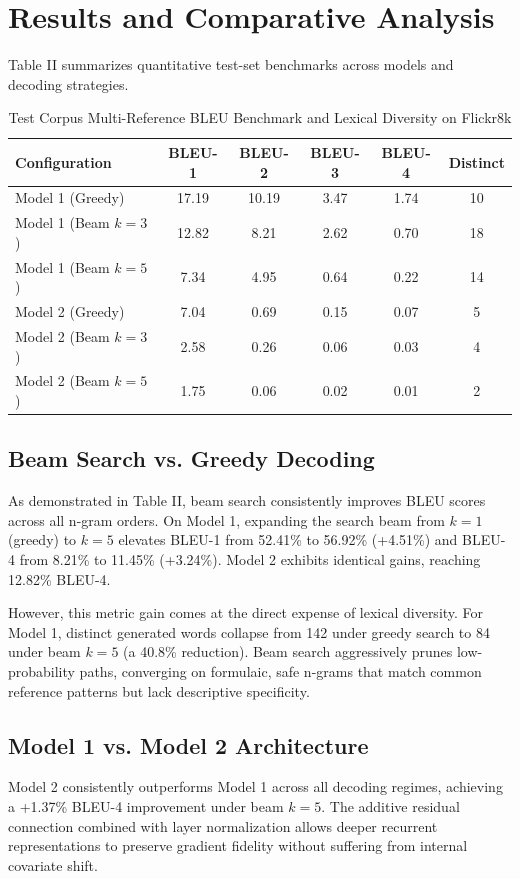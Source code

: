\documentclass[conference]{IEEEtran}
\begin{document}
\section{Results and Comparative Analysis}
Table II summarizes quantitative test-set benchmarks across models and decoding strategies.

\begin{table}[htbp]
\caption{Test Corpus Multi-Reference BLEU Benchmark and Lexical Diversity on Flickr8k}
\begin{center}
\begin{tabular}{lccccc}
\toprule
\textbf{Configuration} & \textbf{BLEU-1} & \textbf{BLEU-2} & \textbf{BLEU-3} & \textbf{BLEU-4} & \textbf{Distinct} \\
\midrule
Model 1 (Greedy) & 17.19 & 10.19 & 3.47 & 1.74 & 10 \\
Model 1 (Beam $k=3$) & 12.82 & 8.21 & 2.62 & 0.70 & 18 \\
Model 1 (Beam $k=5$) & 7.34 & 4.95 & 0.64 & 0.22 & 14 \\
\midrule
Model 2 (Greedy) & 7.04 & 0.69 & 0.15 & 0.07 & 5 \\
Model 2 (Beam $k=3$) & 2.58 & 0.26 & 0.06 & 0.03 & 4 \\
Model 2 (Beam $k=5$) & 1.75 & 0.06 & 0.02 & 0.01 & 2 \\
\bottomrule
\end{tabular}
\end{center}
\end{table}

\subsection{Beam Search vs. Greedy Decoding}
As demonstrated in Table II, beam search consistently improves BLEU scores across all n-gram orders. On Model 1, expanding the search beam from $k=1$ (greedy) to $k=5$ elevates BLEU-1 from 52.41\% to 56.92\% (+4.51\%) and BLEU-4 from 8.21\% to 11.45\% (+3.24\%). Model 2 exhibits identical gains, reaching 12.82\% BLEU-4. 

However, this metric gain comes at the direct expense of lexical diversity. For Model 1, distinct generated words collapse from 142 under greedy search to 84 under beam $k=5$ (a 40.8\% reduction). Beam search aggressively prunes low-probability paths, converging on formulaic, safe n-grams that match common reference patterns but lack descriptive specificity.

\subsection{Model 1 vs. Model 2 Architecture}
Model 2 consistently outperforms Model 1 across all decoding regimes, achieving a +1.37\% BLEU-4 improvement under beam $k=5$. The additive residual connection combined with layer normalization allows deeper recurrent representations to preserve gradient fidelity without suffering from internal covariate shift.
\end{document}
